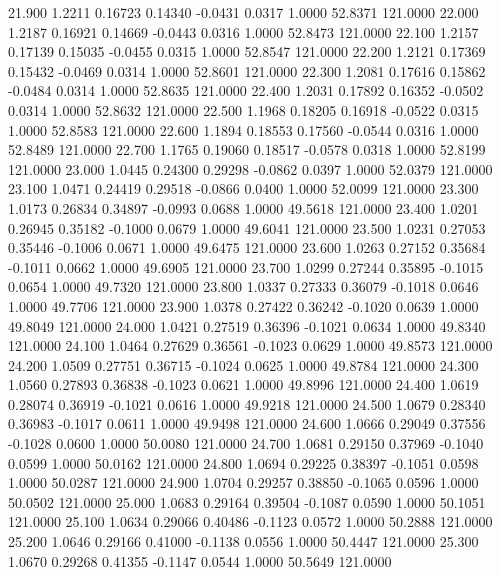   21.900   1.2211   0.16723   0.14340  -0.0431   0.0317   1.0000  52.8371 121.0000
  22.000   1.2187   0.16921   0.14669  -0.0443   0.0316   1.0000  52.8473 121.0000
  22.100   1.2157   0.17139   0.15035  -0.0455   0.0315   1.0000  52.8547 121.0000
  22.200   1.2121   0.17369   0.15432  -0.0469   0.0314   1.0000  52.8601 121.0000
  22.300   1.2081   0.17616   0.15862  -0.0484   0.0314   1.0000  52.8635 121.0000
  22.400   1.2031   0.17892   0.16352  -0.0502   0.0314   1.0000  52.8632 121.0000
  22.500   1.1968   0.18205   0.16918  -0.0522   0.0315   1.0000  52.8583 121.0000
  22.600   1.1894   0.18553   0.17560  -0.0544   0.0316   1.0000  52.8489 121.0000
  22.700   1.1765   0.19060   0.18517  -0.0578   0.0318   1.0000  52.8199 121.0000
  23.000   1.0445   0.24300   0.29298  -0.0862   0.0397   1.0000  52.0379 121.0000
  23.100   1.0471   0.24419   0.29518  -0.0866   0.0400   1.0000  52.0099 121.0000
  23.300   1.0173   0.26834   0.34897  -0.0993   0.0688   1.0000  49.5618 121.0000
  23.400   1.0201   0.26945   0.35182  -0.1000   0.0679   1.0000  49.6041 121.0000
  23.500   1.0231   0.27053   0.35446  -0.1006   0.0671   1.0000  49.6475 121.0000
  23.600   1.0263   0.27152   0.35684  -0.1011   0.0662   1.0000  49.6905 121.0000
  23.700   1.0299   0.27244   0.35895  -0.1015   0.0654   1.0000  49.7320 121.0000
  23.800   1.0337   0.27333   0.36079  -0.1018   0.0646   1.0000  49.7706 121.0000
  23.900   1.0378   0.27422   0.36242  -0.1020   0.0639   1.0000  49.8049 121.0000
  24.000   1.0421   0.27519   0.36396  -0.1021   0.0634   1.0000  49.8340 121.0000
  24.100   1.0464   0.27629   0.36561  -0.1023   0.0629   1.0000  49.8573 121.0000
  24.200   1.0509   0.27751   0.36715  -0.1024   0.0625   1.0000  49.8784 121.0000
  24.300   1.0560   0.27893   0.36838  -0.1023   0.0621   1.0000  49.8996 121.0000
  24.400   1.0619   0.28074   0.36919  -0.1021   0.0616   1.0000  49.9218 121.0000
  24.500   1.0679   0.28340   0.36983  -0.1017   0.0611   1.0000  49.9498 121.0000
  24.600   1.0666   0.29049   0.37556  -0.1028   0.0600   1.0000  50.0080 121.0000
  24.700   1.0681   0.29150   0.37969  -0.1040   0.0599   1.0000  50.0162 121.0000
  24.800   1.0694   0.29225   0.38397  -0.1051   0.0598   1.0000  50.0287 121.0000
  24.900   1.0704   0.29257   0.38850  -0.1065   0.0596   1.0000  50.0502 121.0000
  25.000   1.0683   0.29164   0.39504  -0.1087   0.0590   1.0000  50.1051 121.0000
  25.100   1.0634   0.29066   0.40486  -0.1123   0.0572   1.0000  50.2888 121.0000
  25.200   1.0646   0.29166   0.41000  -0.1138   0.0556   1.0000  50.4447 121.0000
  25.300   1.0670   0.29268   0.41355  -0.1147   0.0544   1.0000  50.5649 121.0000
